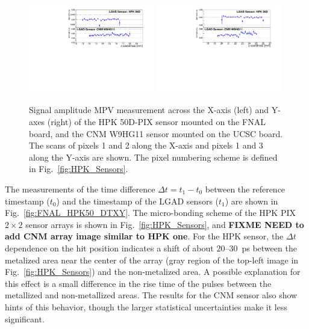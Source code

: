 \documentclass[preprint,1p]{elsarticle}
\begin{document}
\begin{figure}[htbp] 
\centering
\includegraphics[width=0.49\textwidth]{figs/HPK50DVsCNM_MPV_vs_X.pdf} 
\includegraphics[width=0.49\textwidth]{figs/HPK50DVsCNM_MPV_vs_Y.pdf} 
\caption{Signal amplitude MPV measurement across the X-axis (left) and Y-axes (right) of 
the HPK 50D-PIX sensor mounted on the FNAL board, and the CNM W9HG11 sensor mounted on 
the UCSC board. The scans of pixels 1 and 2 along the X-axis and pixels 1 and 3 
along the Y-axis are shown. The pixel numbering scheme is defined in Fig.~\ref{fig:HPK_Sensors}.} 
\label{fig:FNAL_HPK50_MPVXY} 
\end{figure} 


The measurements of the time difference $\Delta t = t_{1}-t_{0}$ between the
reference timestamp ($t_0$) and the timestamp of the LGAD sensors ($t_1$) are
shown in Fig.~\ref{fig:FNAL_HPK50_DTXY}. The micro-bonding scheme of the HPK PIX
$2\times 2$ sensor arrays is shown in Fig.~\ref{fig:HPK_Sensors}, and \textbf
{FIXME NEED to add CNM array image similar to HPK one}. For the HPK sensor,
the $\Delta t$ dependence on the hit position indicates a shift of 
about $20$--$30$~ps between the metalized area near the center of the array
(gray region of the top-left image in Fig.~\ref{fig:HPK_Sensors}) and the non-metalized area.
A possible explanation for this effect is a small difference in
the rise time of the pulses between the metallized and non-metallized areas. 
The results for the CNM sensor also show hints of this behavior, though the
larger statistical uncertainties make it less significant.
\end{document}
